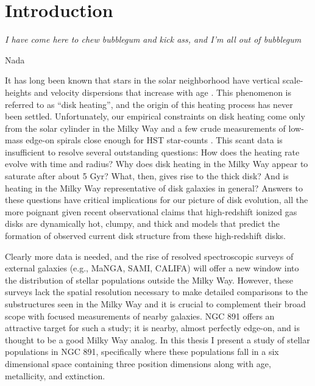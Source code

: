 \chapter[Introduction]{Introduction}
\label{chap:intro}
\epigraph{\fixspacing\emph{I have come here to chew bubblegum and kick
    ass, and I'm all out of bubblegum}}{Nada}


\cleardoublepage 

It has long been known that stars in the solar neighborhood have
vertical scale-heights and velocity dispersions that increase with age
\citep[e.g.,][]{Wielen74}. This phenomenon is referred to as ``disk
heating'', and the origin of this heating process has never been
settled. Unfortunately, our empirical constraints on disk heating come
only from the solar cylinder in the Milky Way and a few crude
measurements of low-mass edge-on spirals close enough for HST
star-counts \citep{Seth05a}. This scant data is insufficient to
resolve several outstanding questions: How does the heating rate
evolve with time and radius?  Why does disk heating in the Milky Way
appear to saturate after about 5 Gyr?  What, then, gives rise to the
thick disk?  And is heating in the Milky Way representative of disk
galaxies in general? Answers to these questions have critical
implications for our picture of disk evolution, all the more poignant
given recent observational claims that high-redshift ionized gas disks
are dynamically hot, clumpy, and thick \citep{Forster-Schreiber09} and
models \citep{Bird13} that predict the formation of observed current
disk structure from these high-redshift disks.

Clearly more data is needed, and the rise of resolved spectroscopic
surveys of external galaxies (e.g., MaNGA, SAMI, CALIFA) will offer a
new window into the distribution of stellar populations outside the
Milky Way. However, these surveys lack the spatial resolution
necessary to make detailed comparisons to the substructures seen in
the Milky Way and it is crucial to complement their broad scope with
focused measurements of nearby galaxies. NGC 891 offers an attractive
target for such a study; it is nearby, almost perfectly edge-on, and
is thought to be a good Milky Way analog. In this thesis I present a
study of stellar populations in NGC 891, specifically where these
populations fall in a six dimensional space containing three position
dimensions along with age, metallicity, and extinction.

